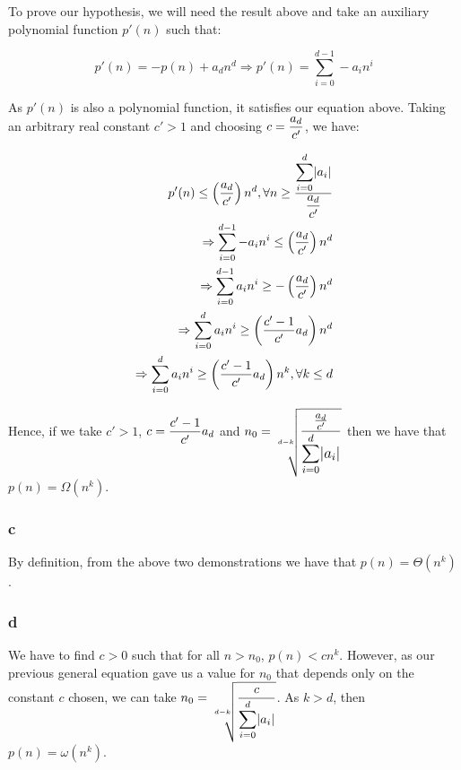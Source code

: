 \documentclass[8pt,a4paper]{article}
\begin{document}
  To prove our hypothesis, we will need the result above and take an auxiliary polynomial function $p'(n)$ such that:

\begin{equation*}
  p'(n) = -p(n) + a_{d}n^{d} \Rightarrow p'(n) = \sum_{i = 0}^{d - 1} -a_{i} n^{i}
\end{equation*}

  As $p'(n)$ is also a polynomial function, it satisfies our equation above. Taking an arbitrary real constant $c' > 1$
and choosing $c = \mathlarger{\frac{a_{d}}{c'}}$, we have:

\begin{equation*}
  \begin{split}
    p'(n) \leq \left(\frac{a_{d}}{c'}\right) n^{d}, \forall n \geq \frac{\mathlarger{\sum}_{i = 0}^{d} |a_{i}|}{\mathlarger{\frac{a_{d}}{c'}}} \\
    \Rightarrow \sum_{i = 0}^{d - 1} -a_{i} n^{i} \leq \left(\frac{a_{d}}{c'}\right) n^{d} \\
    \Rightarrow \sum_{i = 0}^{d - 1} a_{i} n^{i} \geq - \left(\frac{a_{d}}{c'}\right) n^{d} \\
    \Rightarrow \sum_{i = 0}^{d} a_{i} n^{i} \geq \left(\frac{c' - 1}{c'} a_{d}\right) n^{d} \\
    \Rightarrow \sum_{i = 0}^{d} a_{i} n^{i} \geq \left(\frac{c' - 1}{c'} a_{d}\right) n^{k}, \forall k \leq d \\
  \end{split}
\end{equation*}

  Hence, if we take $c' > 1$, $c = \mathlarger{\frac{c' - 1}{c'}} a_{d}$ and
$n_{0} = \mathlarger{\sqrt[d - k]{\mathlarger{\frac{\frac{a_{d}}{c'}}{\mathlarger{\sum}_{i = 0}^{d} |a_{i}|}}}}$
then we have that $p(n) = \Omega(n^{k})$.

\subsubsection*{c}

  By definition, from the above two demonstrations we have that $p(n) = \Theta(n^{k})$.

\subsubsection*{d}

  We have to find $c > 0$ such that for all $n > n_{0}$, $p(n) < cn^{k}$.
However, as our previous general equation gave us a value for $n_{0}$ that depends
only on the constant $c$ chosen, we can take $n_{0} = \mathlarger{\sqrt[d - k]{\frac{c}{\mathlarger{\sum}_{i = 0}^{d} |a_{i}|}}}$.
As $k > d$, then $p(n) = \omega(n^{k})$.
\end{document}
